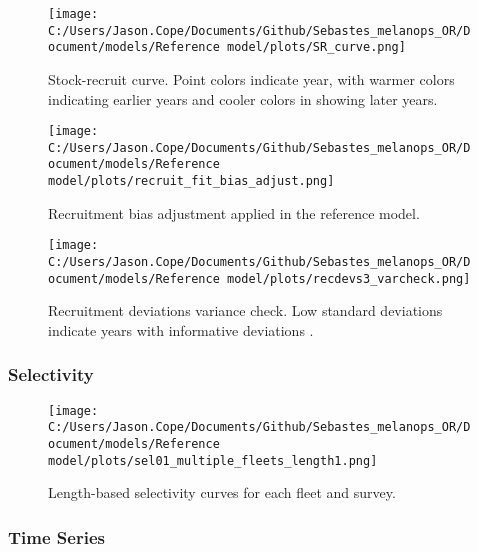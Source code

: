 \documentclass[11pt,
  english,
  letterpaper,
]{article}
\begin{document}
\newpage

\begin{figure}
\centering
\texttt{[image: C:/Users/Jason.Cope/Documents/Github/Sebastes\_melanops\_OR/Document/models/Reference model/plots/SR\_curve.png]}
\caption{Stock-recruit curve. Point colors indicate year, with warmer colors indicating earlier years and cooler colors in showing later years.\label{fig:bh-curve}}
\end{figure}

\newpage

\begin{figure}
\centering
\texttt{[image: C:/Users/Jason.Cope/Documents/Github/Sebastes\_melanops\_OR/Document/models/Reference model/plots/recruit\_fit\_bias\_adjust.png]}
\caption{Recruitment bias adjustment applied in the reference model.\label{fig:bias-adj}}
\end{figure}

\newpage

\begin{figure}
\centering
\texttt{[image: C:/Users/Jason.Cope/Documents/Github/Sebastes\_melanops\_OR/Document/models/Reference model/plots/recdevs3\_varcheck.png]}
\caption{Recruitment deviations variance check. Low standard deviations indicate years with informative deviations .\label{fig:varcheck}}
\end{figure}

\newpage

\hypertarget{selectivity}{%
\subsubsection{Selectivity}\label{selectivity}}

\begin{figure}
\centering
\texttt{[image: C:/Users/Jason.Cope/Documents/Github/Sebastes\_melanops\_OR/Document/models/Reference model/plots/sel01\_multiple\_fleets\_length1.png]}
\caption{Length-based selectivity curves for each fleet and survey.\label{fig:fleet-selectivity}}
\end{figure}

\newpage

\hypertarget{time-series}{%
\subsubsection{Time Series}\label{time-series}}
\end{document}
